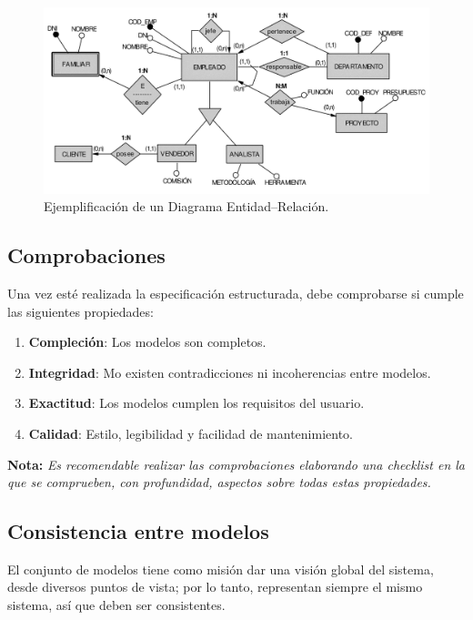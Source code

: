 \begin{figure}[H]
    \centering
    \includegraphics[width=0.9\linewidth]{Resources/Tema5/ejemploDER.png}
    \caption{Ejemplificación de un Diagrama Entidad--Relación.}
\end{figure}

\subsection{Comprobaciones}

Una vez esté realizada la especificación estructurada, debe comprobarse si cumple las siguientes propiedades:

\begin{enumerate}
    \item \textbf{Compleción}: Los modelos son completos.
    \item \textbf{Integridad}: Mo existen contradicciones ni incoherencias entre modelos.
    \item \textbf{Exactitud}: Los modelos cumplen los requisitos del usuario.
    \item \textbf{Calidad}: Estilo, legibilidad y facilidad de mantenimiento.
\end{enumerate}

\textbf{Nota:} \textit{Es recomendable realizar las comprobaciones elaborando una checklist en la que se comprueben, con profundidad, aspectos sobre todas estas propiedades.}

\subsection{Consistencia entre modelos}

El conjunto de modelos tiene como misión dar una visión global del sistema, desde diversos puntos de vista; por lo tanto, representan siempre el mismo sistema, así que deben ser consistentes.\\

